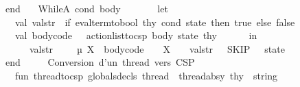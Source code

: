 \begin{isabellebody}
\ \ \ \ \ \ end\isanewline
\ \ {\isacharbar}{\kern0pt}\ WhileA\ {\isacharparenleft}{\kern0pt}cond{\isacharcomma}{\kern0pt}\ body{\isacharparenright}{\kern0pt}\ {\isacharequal}{\kern0pt}{\isachargreater}{\kern0pt}\isanewline
\ \ \ \ \ \ let\isanewline
\ \ \ \ \ \ \ \ val\ val{\isacharunderscore}{\kern0pt}str\ {\isacharequal}{\kern0pt}\ if\ eval{\isacharunderscore}{\kern0pt}term{\isacharunderscore}{\kern0pt}to{\isacharunderscore}{\kern0pt}bool\ thy\ cond\ state\ then\ {\isachardoublequote}{\kern0pt}true{\isachardoublequote}{\kern0pt}\ else\ {\isachardoublequote}{\kern0pt}false{\isachardoublequote}{\kern0pt}\isanewline
\ \ \ \ \ \ \ \ val\ {\isacharparenleft}{\kern0pt}body{\isacharunderscore}{\kern0pt}code{\isacharcomma}{\kern0pt}\ {\isacharunderscore}{\kern0pt}{\isacharparenright}{\kern0pt}\ {\isacharequal}{\kern0pt}\ action{\isacharunderscore}{\kern0pt}list{\isacharunderscore}{\kern0pt}to{\isacharunderscore}{\kern0pt}csp\ body\ state\ thy\isanewline
\ \ \ \ \ \ in\isanewline
\ \ \ \ \ \ \ \ {\isacharparenleft}{\kern0pt}{\isachardoublequote}{\kern0pt}{\isacharbraceleft}{\kern0pt}\ {\isacharparenleft}{\kern0pt}{\isachardoublequote}{\kern0pt}\ {\isacharcircum}{\kern0pt}\ val{\isacharunderscore}{\kern0pt}str\ {\isacharcircum}{\kern0pt}\ {\isachardoublequote}{\kern0pt}\ {\isacharampersand}{\kern0pt}\ \ µ\ X{\isachardot}{\kern0pt}{\isachardoublequote}{\kern0pt}\ {\isacharcircum}{\kern0pt}\ body{\isacharunderscore}{\kern0pt}code\ {\isacharcircum}{\kern0pt}\ {\isachardoublequote}{\kern0pt}\ {\isacharminus}{\kern0pt}{\isachargreater}{\kern0pt}\ X{\isacharparenright}{\kern0pt}\ {\isacharbrackleft}{\kern0pt}{\isacharbrackright}{\kern0pt}\ {\isacharparenleft}{\kern0pt}{\isasymnot}{\isachardoublequote}{\kern0pt}\ {\isacharcircum}{\kern0pt}\ val{\isacharunderscore}{\kern0pt}str\ {\isacharcircum}{\kern0pt}{\isachardoublequote}{\kern0pt}\ {\isacharampersand}{\kern0pt}\ {\isacharparenleft}{\kern0pt}SKIP{\isacharparenright}{\kern0pt}\ {\isacharparenright}{\kern0pt}\ {\isacharbraceright}{\kern0pt}{\isachardoublequote}{\kern0pt}{\isacharcomma}{\kern0pt}\ state{\isacharparenright}{\kern0pt}\isanewline
\ \ \ \ \ \ end\isanewline
\isanewline
\isanewline
\ \ \ \ {\isacharparenleft}{\kern0pt}{\isacharasterisk}{\kern0pt}\ Conversion\ d’un\ thread\ vers\ CSP\ {\isacharasterisk}{\kern0pt}{\isacharparenright}{\kern0pt}\isanewline
\ \ \ \ \ \ \ \ fun\ thread{\isacharunderscore}{\kern0pt}to{\isacharunderscore}{\kern0pt}csp\ globals{\isacharunderscore}{\kern0pt}decls\ {\isacharparenleft}{\kern0pt}thread\ {\isacharcolon}{\kern0pt}\ thread{\isacharunderscore}{\kern0pt}absy{\isacharparenright}{\kern0pt}\ thy\ {\isacharcolon}{\kern0pt}\ string\ {\isacharequal}{\kern0pt}\isanewline

\end{isabellebody}

